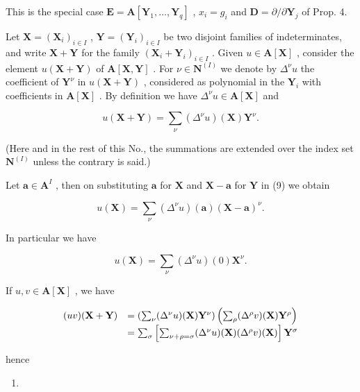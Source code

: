 This is the special case \(\mathbf{E} = \mathbf{A}[\mathbf{Y}_1,\dots ,\mathbf{Y}_q]\) , \(x_{i} = g_{i}\) and \(\mathbf{D} = \partial /\partial \mathbf{Y}_j\) of Prop. 4.

Let \(\mathbf{X} = (\mathbf{X}_i)_{i\in I}\) , \(\mathbf{Y} = (\mathbf{Y}_i)_{i\in I}\) be two disjoint families of indeterminates, and write \(\mathbf{X} + \mathbf{Y}\) for the family \((\mathbf{X}_i + \mathbf{Y}_i)_{i\in I}\) . Given \(u\in \mathbf{A}[\mathbf{X}]\) , consider the element \(u(\mathbf{X} + \mathbf{Y})\) of \(\mathbf{A}[\mathbf{X},\mathbf{Y}]\) . For \(\nu \in \mathbf{N}^{(I)}\) we denote by \(\Delta^{\nu}u\) the coefficient of \(\mathbf{Y}^{\nu}\) in \(u(\mathbf{X} + \mathbf{Y})\) , considered as polynomial in the \(\mathbf{Y}_i\) with coefficients in \(\mathbf{A}[\mathbf{X}]\) . By definition we have \(\Delta^{\nu}u\in \mathbf{A}[\mathbf{X}]\) and

\[
u (\mathbf {X} + \mathbf {Y}) = \sum_ {\nu} \left(\Delta^ {\nu} u\right) (\mathbf {X}) \mathbf {Y} ^ {\nu}.\tag{9}
\]

(Here and in the rest of this No., the summations are extended over the index set \(\mathbf{N}^{(I)}\) unless the contrary is said.)

Let \(\mathbf{a} \in \mathbf{A}^{I}\) , then on substituting \(\mathbf{a}\) for \(\mathbf{X}\) and \(\mathbf{X} - \mathbf{a}\) for \(\mathbf{Y}\) in (9) we obtain

\[
u (\mathbf {X}) = \sum_ {\nu} \left(\Delta^ {\nu} u\right) (\mathbf {a}) (\mathbf {X} - \mathbf {a}) ^ {\nu}.\tag{10}
\]

In particular we have

\[
u (\mathbf {X}) = \sum_ {\nu} \left(\Delta^ {\nu} u\right) (0) \mathbf {X} ^ {\nu}.\tag{11}
\]

If \(u, v \in \mathbf{A}[\mathbf{X}]\) , we have

\[
\begin{array}{r l} (u v) (\mathbf {X} + \mathbf {Y}) & = \left(\sum_ {\nu} (\Delta^ {\nu} u) (\mathbf {X}) \mathbf {Y} ^ {\nu}\right) \left(\sum_ {\rho} (\Delta^ {\rho} v) (\mathbf {X}) \mathbf {Y} ^ {\rho}\right) \\ & = \sum_ {\sigma} \left[ \sum_ {\nu + \rho = \sigma} (\Delta^ {\nu} u) (\mathbf {X}) (\Delta^ {\rho} v) (\mathbf {X}) \right] \mathbf {Y} ^ {\sigma} \end{array}
\]

hence

\begin{enumerate}
\def\labelenumi{(\arabic{enumi})}
\setcounter{enumi}{11}
\tightlist
\item
\end{enumerate}

